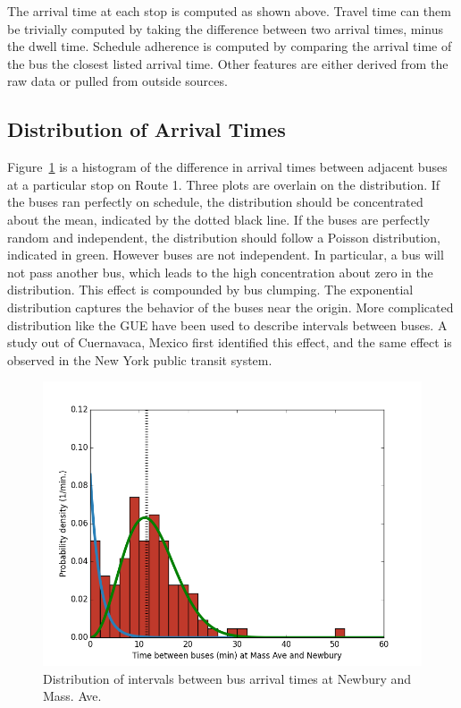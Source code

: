 The arrival time at each stop is computed as shown above.
Travel time can them be trivially computed by taking the difference between two arrival times, minus the dwell time.
Schedule adherence is computed by comparing the arrival time of the bus the closest listed arrival time.
Other features are either derived from the raw data or pulled from outside sources.

\subsection{Distribution of Arrival Times}

Figure~\ref{dist} is a histogram of the difference in arrival times between adjacent buses at a particular stop on Route 1.
Three plots are overlain on the distribution.
If the buses ran perfectly on schedule, the distribution should be concentrated about the mean, indicated by the dotted black line.
If the buses are perfectly random and independent, the distribution should follow a Poisson distribution, indicated in green.
However buses are not independent.
In particular, a bus will not pass another bus, which leads to the high concentration about zero in the distribution.
This effect is compounded by bus clumping.
The exponential distribution captures the behavior of the buses near the origin.
More complicated distribution like the GUE have been used to describe intervals between buses.
A study out of Cuernavaca, Mexico \cite{baik2006model} first identified this effect, and the same effect is observed in the New York public transit system.

\begin{figure}
\includegraphics[width=\linewidth]{images/dist.png}
\caption{Distribution of intervals between bus arrival times at Newbury and Mass. Ave.}
\label{dist}
\end{figure}
\clearpage
\newpage

